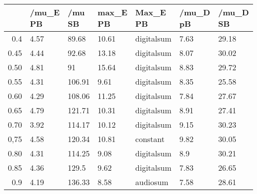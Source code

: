 \begin{table}[ht]
\centering
\begin{tabular}{rllllll}
  \hline
 & /mu\_E PB & /mu SB & max\_E PB & Max\_E PB & /mu\_D pB & /mu\_D SB \\ 
  \hline
0.4 & 4.57 & 89.68 & 10.61 & digitalsum & 7.63 & 29.18 \\ 
  0.45 & 4.44 & 92.68 & 13.18 & digitalsum & 8.07 & 30.02 \\ 
  0.50 & 4.81 & 91 & 15.64 & digitalsum & 8.83 & 29.72 \\ 
  0.55 & 4.31 & 106.91 & 9.61 & digitalsum & 8.35 & 25.58 \\ 
  0.60 & 4.29 & 108.06 & 11.25 & digitalsum & 7.84 & 27.67 \\ 
  0.65 & 4.79 & 121.71 & 10.31 & digitalsum & 8.91 & 27.41 \\ 
  0.70 & 3.92 & 114.17 & 10.12 & digitalsum & 9.15 & 30.23 \\ 
  0,75 & 4.58 & 120.34 & 10.81 & constant & 9.82 & 30.05 \\ 
  0.80 & 4.31 & 114.25 & 9.08 & digitalsum & 8.9 & 30.21 \\ 
  0.85 & 4.36 & 129.5 & 9.62 & digitalsum & 7.83 & 26.65 \\ 
  0.9 & 4.19 & 136.33 & 8.58 & audiosum & 7.58 & 28.61 \\ 
   \hline
\end{tabular}
\end{table}
